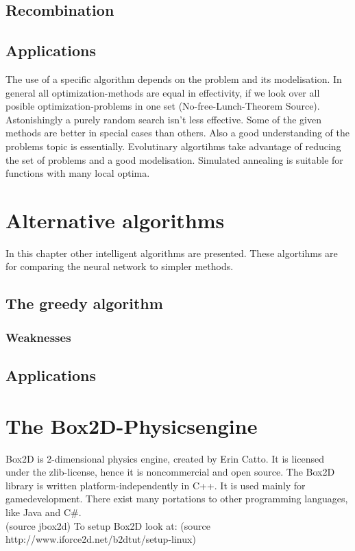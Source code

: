 \documentclass[10pt,a4paper,DIV=11]{scrreprt}
\begin{document}
\section{Recombination}



\section{Applications}
The use of a specific algorithm depends on the problem and its modelisation. In general all optimization-methods are equal in effectivity, if we look over all posible optimization-problems in one set (No-free-Lunch-Theorem Source). Astonishingly a purely random search isn't less effective.
Some of the given methods are better in special cases than others. Also a good understanding of the problems topic is essentially. Evolutinary algortihms take advantage of reducing the set of problems and a good modelisation.
Simulated annealing is suitable for functions with many local optima.


\chapter{Alternative algorithms}
In this chapter other intelligent algorithms are presented.
These algortihms are for comparing the neural network to simpler
methods.

\section{The greedy algorithm}

\subsection{Weaknesses}

\section{Applications}





\chapter{The Box2D-Physicsengine}
Box2D is 2-dimensional physics engine, created by Erin Catto. It is licensed under the zlib-license, hence it is noncommercial and open source. The Box2D library is written platform-independently in C++. It is used mainly for gamedevelopment. There exist many portations to other programming languages, like Java and C\#. \\
(source jbox2d)
To setup Box2D look at:
(source http://www.iforce2d.net/b2dtut/setup-linux)
\end{document}
